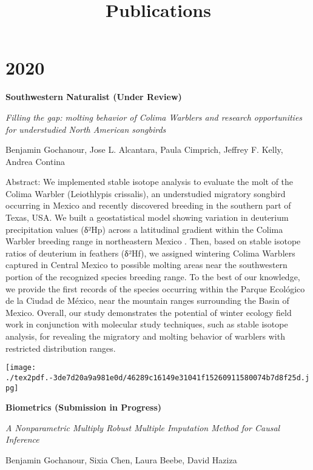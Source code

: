 \documentclass[]{article}
\title{Publications}
\author{}
\date{}
\begin{document}
\maketitle

\hypertarget{section}{%
\section{\texorpdfstring{\textbf{2020}}{2020}}\label{section}}

\textbf{Southwestern Naturalist (Under Review)}

\emph{Filling the gap: molting behavior of Colima Warblers and research
opportunities for understudied North American songbirds}

Benjamin Gochanour, Jose L. Alcantara, Paula Cimprich, Jeffrey F. Kelly,
Andrea Contina

Abstract: We implemented stable isotope analysis to evaluate the molt of
the Colima Warbler (Leiothlypis crissalis), an understudied migratory
songbird occurring in Mexico and recently discovered breeding in the
southern part of Texas, USA. We built a geostatistical model showing
variation in deuterium precipitation values (δ²Hp) across a latitudinal
gradient within the Colima Warbler breeding range in northeastern Mexico
. Then, based on stable isotope ratios of deuterium in feathers (δ²Hf),
we assigned wintering Colima Warblers captured in Central Mexico to
possible molting areas near the southwestern portion of the recognized
species breeding range. To the best of our knowledge, we provide the
first records of the species occurring within the Parque Ecológico de la
Ciudad de México, near the mountain ranges surrounding the Basin of
Mexico. Overall, our study demonstrates the potential of winter ecology
field work in conjunction with molecular study techniques, such as
stable isotope analysis, for revealing the migratory and molting
behavior of warblers with restricted distribution ranges.

\texttt{[image: ./tex2pdf.-3de7d20a9a981e0d/46289c16149e31041f15260911580074b7d8f25d.jpg]}

\textbf{Biometrics (Submission in Progress)}

\emph{A Nonparametric Multiply Robust Multiple Imputation Method for
Causal Inference}

Benjamin Gochanour, Sixia Chen, Laura Beebe, David Haziza
\end{document}
